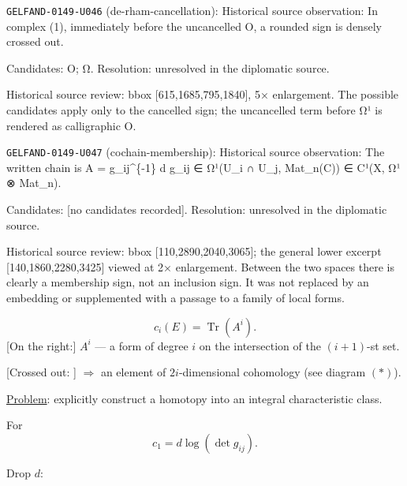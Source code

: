 \noindent\texttt{GELFAND-0149-U046} (de-rham-cancellation): Historical source observation: In complex (1), immediately before the uncancelled O, a rounded sign is densely crossed out.\par
Candidates: O; Ω. Resolution: unresolved in the diplomatic source.\par
Historical source review: bbox [615,1685,795,1840], 5× enlargement. The possible candidates apply only to the cancelled sign; the uncancelled term before Ω¹ is rendered as calligraphic O.\par

\noindent\texttt{GELFAND-0149-U047} (cochain-membership): Historical source observation: The written chain is A = g\_ij\textasciicircum{}\{-1\} d g\_ij ∈ Ω¹(U\_i ∩ U\_j, Mat\_n(C)) ∈ C¹(X, Ω¹ ⊗ Mat\_n).\par
Candidates: [no candidates recorded]. Resolution: unresolved in the diplomatic source.\par
Historical source review: bbox [110,2890,2040,3065]; the general lower excerpt [140,1860,2280,3425] viewed at 2× enlargement. Between the two spaces there is clearly a membership sign, not an inclusion sign. It was not replaced by an embedding or supplemented with a passage to a family of local forms.\par



\begin{equation*}
c_i(E)=\operatorname{Tr}(A^i).
\end{equation*}
[On the right:] $A^i$ --- a form of degree $i$ on the intersection of the $(i+1)$-st set.

[Crossed out: ]
$\Rightarrow$ an element of $2i$-dimensional cohomology (see diagram $(*)$).

\underline{Problem}: explicitly construct a homotopy into an integral characteristic class.

For
\begin{equation*}
c_1=d\log(\det g_{ij}).
\end{equation*}

Drop $d$:



